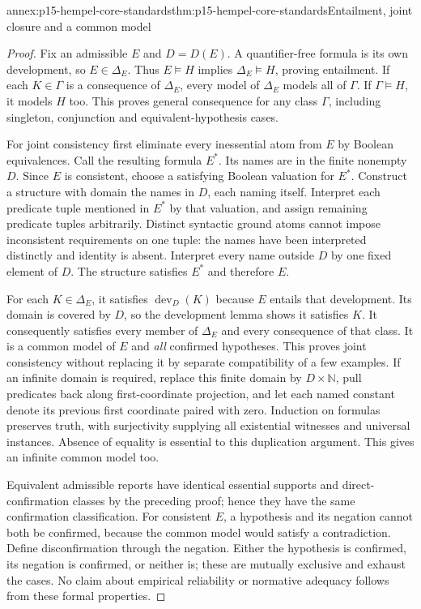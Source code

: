 \begin{annexitem}{annex:p15-hempel-core-standards}{thm:p15-hempel-core-standards}{Entailment, joint closure and a common model}
\begin{proof}
Fix an admissible $E$ and $D=D(E)$. A quantifier-free formula is its
own development, so $E\in\Delta_E$. Thus $E\models H$ implies
$\Delta_E\models H$, proving entailment. If each $K\in\Gamma$ is
a consequence of $\Delta_E$, every model of $\Delta_E$ models all
of $\Gamma$. If $\Gamma\models H$, it models $H$ too. This proves
general consequence for any class $\Gamma$, including singleton,
conjunction and equivalent-hypothesis cases.

For joint consistency first eliminate every inessential atom from $E$
by Boolean equivalences. Call the resulting formula $E^*$. Its names
are in the finite nonempty $D$. Since $E$ is consistent, choose a
satisfying Boolean valuation for $E^*$. Construct a structure with
domain the names in $D$, each naming itself. Interpret each predicate
tuple mentioned in $E^*$ by that valuation, and assign remaining
predicate tuples arbitrarily. Distinct syntactic ground atoms cannot
impose inconsistent requirements on one tuple: the names have been
interpreted distinctly and identity is absent. Interpret every name
outside $D$ by one fixed element of $D$. The structure satisfies
$E^*$ and therefore $E$.

For each $K\in\Delta_E$, it satisfies $\operatorname{dev}_D(K)$
because $E$ entails that development. Its domain is covered by $D$,
so the development lemma shows it satisfies $K$. It consequently
satisfies every member of $\Delta_E$ and every consequence of that
class. It is a common model of $E$ and \emph{all} confirmed hypotheses.
This proves joint consistency without replacing it by separate
compatibility of a few examples. If an infinite domain is required,
replace this finite domain by $D\times\mathbb N$, pull predicates
back along first-coordinate projection, and let each named constant
denote its previous first coordinate paired with zero. Induction on
formulas preserves truth, with surjectivity supplying all existential
witnesses and universal instances. Absence of equality is essential
to this duplication argument. This gives an infinite common model too.

Equivalent admissible reports have identical essential supports and
direct-confirmation classes by the preceding proof; hence they have
the same confirmation classification. For consistent $E$, a hypothesis
and its negation cannot both be confirmed, because the common model
would satisfy a contradiction. Define disconfirmation through the
negation. Either the hypothesis is confirmed, its negation is confirmed,
or neither is; these are mutually exclusive and exhaust the cases.
No claim about empirical reliability or normative adequacy follows
from these formal properties.
\end{proof}
\end{annexitem}

